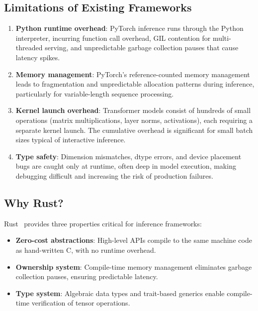 \documentclass[11pt,twocolumn]{article}
\begin{document}
\subsection{Limitations of Existing Frameworks}

\begin{enumerate}[leftmargin=1.4em]
    \item \textbf{Python runtime overhead}: PyTorch inference runs through the Python interpreter, incurring function call overhead, GIL contention for multi-threaded serving, and unpredictable garbage collection pauses that cause latency spikes.
    \item \textbf{Memory management}: PyTorch's reference-counted memory management leads to fragmentation and unpredictable allocation patterns during inference, particularly for variable-length sequence processing.
    \item \textbf{Kernel launch overhead}: Transformer models consist of hundreds of small operations (matrix multiplications, layer norms, activations), each requiring a separate kernel launch. The cumulative overhead is significant for small batch sizes typical of interactive inference.
    \item \textbf{Type safety}: Dimension mismatches, dtype errors, and device placement bugs are caught only at runtime, often deep in model execution, making debugging difficult and increasing the risk of production failures.
\end{enumerate}

\subsection{Why Rust?}

Rust~\cite{klabnik2019rust} provides three properties critical for inference frameworks:

\begin{itemize}[leftmargin=1.1em]
    \item \textbf{Zero-cost abstractions}: High-level APIs compile to the same machine code as hand-written C, with no runtime overhead.
    \item \textbf{Ownership system}: Compile-time memory management eliminates garbage collection pauses, ensuring predictable latency.
    \item \textbf{Type system}: Algebraic data types and trait-based generics enable compile-time verification of tensor operations.
\end{itemize}
\end{document}
